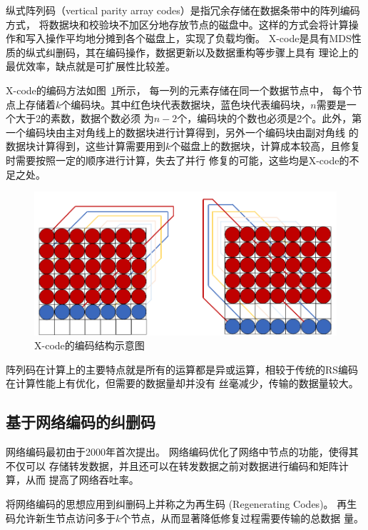 纵式阵列码（vertical parity array codes）是指冗余存储在数据条带中的阵列编码方式，
将数据块和校验块不加区分地存放节点的磁盘中。这样的方式会将计算操作和写入操作平均地分摊到各个磁盘上，实现了负载均衡。
X-code\cite{xu1999x}是具有MDS性质的纵式纠删码，其在编码操作，数据更新以及数据重构等步骤上具有
理论上的最优效率，缺点就是可扩展性比较差。


X-code的编码方法如图~\ref{fig:con-1.5}所示，
每一列的元素存储在同一个数据节点中，
每个节点上存储着$k$个编码块。其中红色块代表数据块，蓝色块代表编码块，$n$需要是一个大于2的素数，数据个数必须
为$n-2$个，编码块的个数也必须是2个。此外，第一个编码块由主对角线上的数据块进行计算得到，另外一个编码块由副对角线
的数据块计算得到，这些计算需要用到$k$个磁盘上的数据块，计算成本较高，且修复时需要按照一定的顺序进行计算，失去了并行
修复的可能，这些均是X-code的不足之处。

\begin{figure}[htbp]
	\centering
	\includegraphics [scale=0.7]{figures/1.5.pdf}
	\caption{X-code的编码结构示意图}
	\label{fig:con-1.5}
\end{figure}


阵列码在计算上的主要特点就是所有的运算都是异或运算，相较于传统的RS编码在计算性能上有优化，但需要的数据量却并没有
丝毫减少，传输的数据量较大。


\subsection{基于网络编码的纠删码}
网络编码最初由\citet{ahlswede2000network}于2000年首次提出。
网络编码优化了网络中节点的功能，使得其不仅可以
存储转发数据，并且还可以在转发数据之前对数据进行编码和矩阵计算，从而
提高了网络吞吐率。

\citet{dimakis2010network}将网络编码的思想应用到纠删码上并称之为再生码
(Regenerating Codes)。
再生码允许新生节点访问多于$k$个节点，从而显著降低修复过程需要传输的总数据
量。


